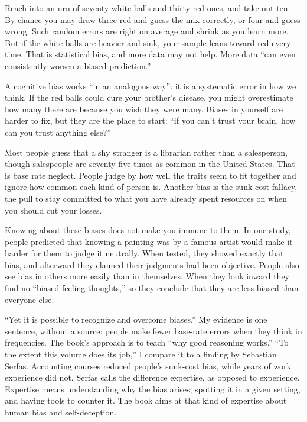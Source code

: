 
Reach into an urn of seventy white balls and thirty red ones, and take out ten. By chance you may draw three red and guess the mix correctly, or four and guess wrong. Such random errors are right on average and shrink as you learn more. But if the white balls are heavier and sink, your sample leans toward red every time. That is statistical bias, and more data may not help. More data ``can even consistently worsen a biased prediction.''

A cognitive bias works ``in an analogous way'': it is a systematic error in how we think. If the red balls could cure your brother's disease, you might overestimate how many there are because you wish they were many. Biases in yourself are harder to fix, but they are the place to start: ``if you can't trust your brain, how can you trust anything else?''

Most people guess that a shy stranger is a librarian rather than a salesperson, though salespeople are seventy-five times as common in the United States.  That is base rate neglect. People judge by how well the traits seem to fit together and ignore how common each kind of person is. Another bias is the sunk cost fallacy, the pull to stay committed to what you have already spent resources on when you should cut your losses.

Knowing about these biases does not make you immune to them. In one study, people predicted that knowing a painting was by a famous artist would make it harder for them to judge it neutrally. When tested, they showed exactly that bias, and afterward they claimed their judgments had been objective. People also see bias in others more easily than in themselves. When they look inward they find no ``biased-feeling thoughts,'' so they conclude that they are less biased than everyone else.

``Yet it is possible to recognize and overcome biases.'' My evidence is one sentence, without a source: people make fewer base-rate errors when they think in frequencies. The book's approach is to teach ``why good reasoning works.'' ``To the extent this volume does its job,'' I compare it to a finding by Sebastian Serfas. Accounting courses reduced people's sunk-cost bias, while years of work experience did not. Serfas calls the difference expertise, as opposed to experience. Expertise means understanding why the bias arises, spotting it in a given setting, and having tools to counter it. The book aims at that kind of expertise about human bias and self-deception. 


